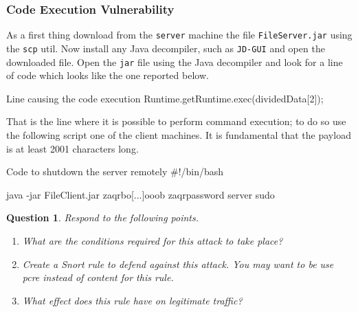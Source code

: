 \documentclass[a4paper,11pt,hidelinks]{article}
\newtheorem{theorem}{Question}[subsection]
\begin{document}
\subsubsection{Code Execution Vulnerability}
As a first thing download from the \texttt{server} machine the file \texttt{FileServer.jar} using the \texttt{scp} util.
\newline
Now install any Java decompiler, such as \texttt{JD-GUI} and open the downloaded file.
\newline
Open the \texttt{jar} file using the Java decompiler and look for a line of code which looks like the one reported below.
\begin{code}{Line causing the code execution}
Runtime.getRuntime.exec(dividedData[2]);
\end{code}
That is the line where it is possible to perform command execution; to do so use the following script one of the client machines. It is fundamental that the payload is at least 2001 characters long.
\begin{code}{Code to shutdown the server remotely}
#!/bin/bash

java -jar FileClient.jar zaqrbo[...]ooob 
    zaqrpassword server sudo%
\end{code}

\begin{theorem}
    Respond to the following points.
    \begin{enumerate}
        \item What are the conditions required for this attack to take place?
        \item Create a Snort rule to defend against this attack. You may want to be use pcre instead of content for this rule.
        \item What effect does this rule have on legitimate traffic?
    \end{enumerate}
\end{theorem}
\end{document}
